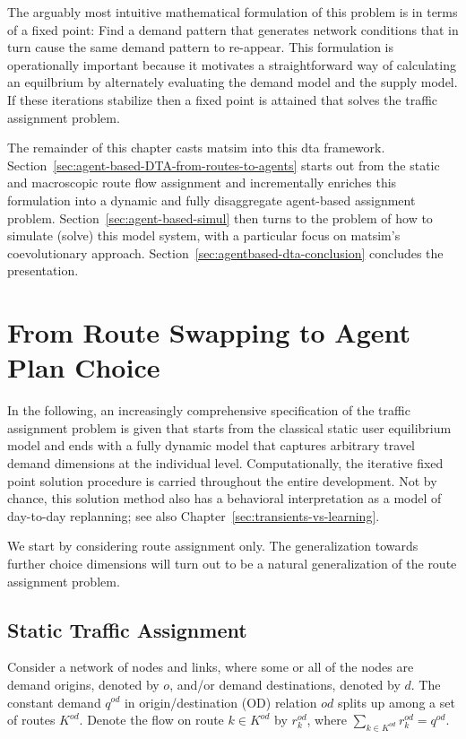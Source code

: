 The arguably most intuitive mathematical formulation of this problem is 
in terms of a fixed point: Find a demand pattern that generates network 
conditions that in turn cause the same demand pattern to re-appear. This 
formulation is operationally important because it motivates a straightforward 
way of calculating an equilbrium by alternately evaluating the demand 
model and the supply model. If these iterations stabilize then a fixed 
point is attained that solves the traffic assignment problem.

The remainder of this chapter casts \gls{matsim} into this \gls{dta} framework.
Section~\ref{sec:agent-based-DTA-from-routes-to-agents} starts out from the
static and macroscopic route flow assignment and incrementally enriches this 
formulation into a dynamic and fully disaggregate agent-based assignment problem.
Section~\ref{sec:agent-based-simul} then turns to the problem of how to
simulate (solve) this model system, with a particular focus on \gls{matsim}'s
coevolutionary approach. Section~\ref{sec:agentbased-dta-conclusion} concludes
the presentation.


\section{\label{sec:agent-based-DTA-from-routes-to-agents}From Route Swapping to Agent Plan Choice}

In the following, an increasingly comprehensive specification of the traffic 
assignment problem is given that starts from the classical static user 
equilibrium model and ends with a fully dynamic model that captures 
arbitrary travel demand dimensions at the individual level. Computationally, 
the iterative fixed point solution procedure is carried throughout the 
entire development. Not by chance, this solution method also has a behavioral 
interpretation as a model of day-to-day replanning; see also Chapter~\ref{sec:transients-vs-learning}.

We start by considering route assignment only. The generalization towards further 
choice dimensions will turn out to be a natural generalization of the route assignment problem.

\subsection{\label{static-macro-assignment}Static Traffic Assignment}

Consider a network of nodes and links, where some or all of the nodes are demand origins, 
denoted by $o$, and/or demand destinations, denoted by $d$. 
The constant demand $q^{od}$ in origin/destination (OD) relation $od$ splits up among a set of routes $K^{od}$. 
Denote the flow on route $k\in K^{od}$ by $r^{od}_k$, where $\sum_{k\in K^{od}} r^{od}_k = q^{od}$.

